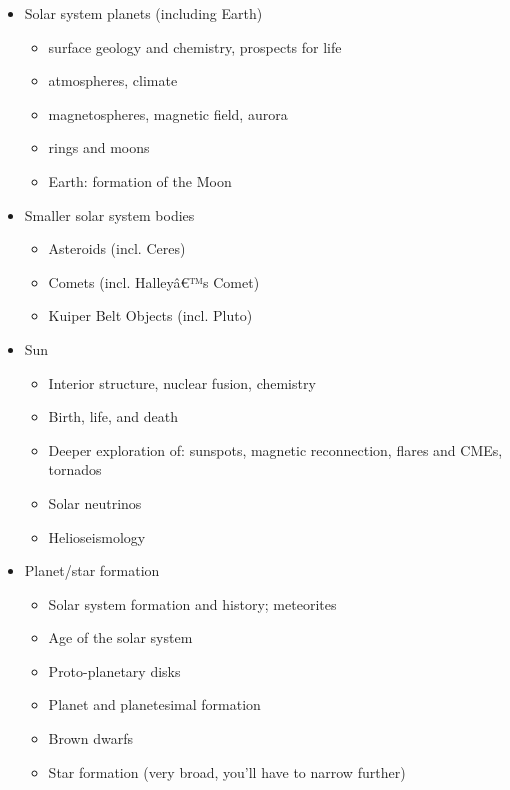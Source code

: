 \documentclass[11pt]{article}%
\begin{document}
\begin{itemize}[noitemsep]
    \item Solar system planets (including Earth)
        \begin{itemize}[noitemsep]
            \item surface geology and chemistry, prospects for life
            \item atmospheres, climate
            \item magnetospheres, magnetic field, aurora
            \item rings and moons
            \item Earth: formation of the Moon
        \end{itemize}
    \item Smaller solar system bodies
        \begin{itemize}[noitemsep]
            \item Asteroids (incl. Ceres)
            \item Comets (incl. Halleyâ€™s Comet)
            \item Kuiper Belt Objects (incl. Pluto)
        \end{itemize}
    \item Sun
        \begin{itemize}[noitemsep]
            \item Interior structure, nuclear fusion, chemistry
            \item Birth, life, and death
            \item Deeper exploration of: sunspots, magnetic reconnection,
                flares and CMEs, tornados
            \item Solar neutrinos
            \item Helioseismology
        \end{itemize}
    \item Planet/star formation
        \begin{itemize}[noitemsep]
            \item Solar system formation and history; meteorites
            \item Age of the solar system
            \item Proto-planetary disks
            \item Planet and planetesimal formation
            \item Brown dwarfs
            \item Star formation (very broad, you'll have to narrow further)
        \end{itemize}

\end{itemize}
\end{document}
